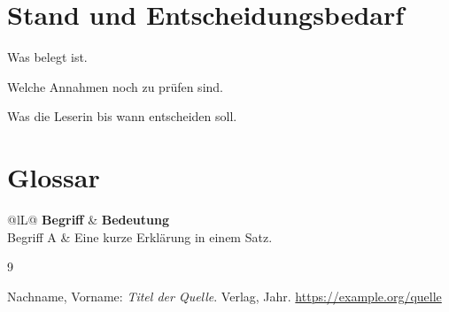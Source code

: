 \documentclass[11pt,a4paper]{scrartcl}
\begin{document}
\section{Stand und Entscheidungsbedarf}\label{sec:stand}

\begin{description}[leftmargin=2.6cm,style=nextline,font=\sffamily\bfseries\small]
  \item[Stand] Was belegt ist.
  \item[Offen] Welche Annahmen noch zu prüfen sind.
  \item[Entscheidung] Was die Leserin bis wann entscheiden soll.
\end{description}

\appendix
\section{Glossar}\label{sec:glossar}

\begin{tabularx}{\textwidth}{@{}lL@{}}
\toprule
\textbf{Begriff} & \textbf{Bedeutung} \\
\midrule
Begriff A & Eine kurze Erklärung in einem Satz. \\
\bottomrule
\end{tabularx}

\begin{thebibliography}{9}
\small
{} Nachname, Vorname: \emph{Titel der Quelle}. Verlag, Jahr.
  \url{https://example.org/quelle}
\end{thebibliography}
\end{document}
